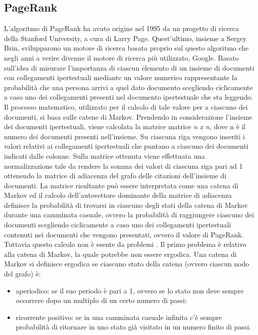 \subsection{PageRank}
L'algoritmo di PageRank \cite{cit_45} ha avuto origine nel 1995 da un progetto di ricerca
della Stanford University, a cura di Larry Page. Quest'ultimo, insieme a Sergey Brin,
svilupparono un motore di ricerca basata proprio sul questo algoritmo che negli anni a verire
divenne il motore di ricerca pi\`u utilizzato, Google. Basato sull'idea di misurare
l'importanza di ciascun elemento di un insieme di documenti con collegamenti ipertestuali
mediante un valore numerico rappresentante la probabilit\`a che una persona arrivi
a quel dato documento scegliendo ciclicamente a caso uno dei collegamenti presenti
nel documento ipertestuale che sta leggendo. Il processo matematico, utilizzato per
il calcolo di tale valore per a ciascuno dei documenti, si basa sulle catene di Markov.
Prendendo in considerazione l'insieme dei documenti ipertestuali, viene calcolata la matrice
matrice \textit{n x n}, dove n \`e il numero dei documenti presenti nell'insieme.
Su ciascuna riga vengono inseriti i valori relativi ai collegamenti ipertestuali
che puntano a ciascuno dei documenti indicati dalle colonne. Sulla matrice ottenuta viene
effettuata una normalizzazione tale da rendere la somma dei valori di ciascuna riga pari ad 1
ottenendo la matrice di adiacenza del grafo delle citazioni dell'insieme di documenti.
La matrice risultante pu\`o essere interpretata come una catena di Markov ed il calcolo
dell'autovettore dominante della matrice di adiacenza definisce la probabilit\`a di
trovarsi in ciascuno degli stati della catena di Markov durante una camminata casuale,
ovvero la probabilit\`a di raggiungere ciascuno dei documenti scegliendo ciclicamente
a caso uno dei collegamenti ipertestuali contenuti nei documenti che vengono presentati,
ovvero il valore di PageRank.\\
Tuttavia questo calcolo non \`e esente da problemi \cite{cit_49}.
Il primo problema \`e relativo alla catena di Markov, la quale potrebbe non essere ergodica.
Una catena di Markov si definisce ergodica se ciascuno stato della catena (ovvero ciascun nodo del grafo) \`e:
\begin{itemize}
\item aperiodico: se il suo periodo \`e pari a 1, ovvero se lo stato non deve sempre
occorrere dopo un multiplo di un certo numero di passi;
\item ricorrente positivo: se in una camminata casuale infinita c'\`e sempre
probabilit\`a di ritornare in uno stato gi\`a visitato in un numero finito
di passi.
\end{itemize}
